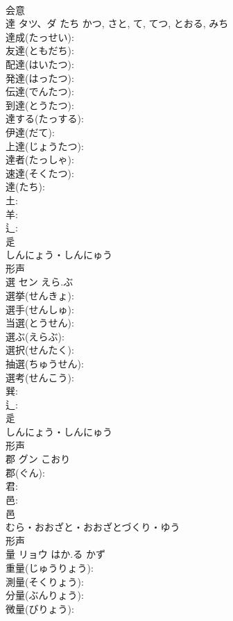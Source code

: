 \documentclass[8pt]{extreport}
\begin{document}
\begin{CJK}{UTF8}{min}
\\	会意 
\\	達	タツ、ダ	たち	かつ, さと, て, てつ, とおる, みち	
\\	達成(たっせい): 
\\	友達(ともだち): 
\\	配達(はいたつ): 
\\	発達(はったつ): 
\\	伝達(でんたつ): 
\\	到達(とうたつ): 
\\	達する(たっする): 
\\	伊達(だて): 
\\	上達(じょうたつ): 
\\	達者(たっしゃ): 
\\	速達(そくたつ): 
\\	達(たち): 
\\	土: 
\\	羊: 
\\	辶: 
\\	辵	
\\	しんにょう・しんにゅう	
\\	形声 
\\	選	セン	えら.ぶ		
\\	選挙(せんきょ): 
\\	選手(せんしゅ): 
\\	当選(とうせん): 
\\	選ぶ(えらぶ): 
\\	選択(せんたく): 
\\	抽選(ちゅうせん): 
\\	選考(せんこう): 
\\	巽: 
\\	辶: 
\\	辵	
\\	しんにょう・しんにゅう	
\\	形声 
\\	郡	グン	こおり		
\\	郡(ぐん): 
\\	君: 
\\	邑: 
\\	邑	
\\	むら・おおざと・おおざとづくり・ゆう	
\\	形声 
\\	量	リョウ	はか.る	かず	
\\	重量(じゅうりょう): 
\\	測量(そくりょう): 
\\	分量(ぶんりょう): 
\\	微量(びりょう): 

\end{CJK}
\end{document}
